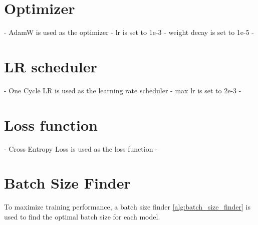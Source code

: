 \section{Optimizer}
- AdamW is used as the optimizer
- lr is set to 1e-3
- weight decay is set to 1e-5
- 

\section{LR scheduler}
- One Cycle LR is used as the learning rate scheduler
- max lr is set to 2e-3
- 

\section{Loss function}
- Cross Entropy Loss is used as the loss function
- 

\section{Batch Size Finder}
To maximize training performance, a batch size finder \ref{alg:batch_size_finder} is used to find the optimal batch size for each model.

